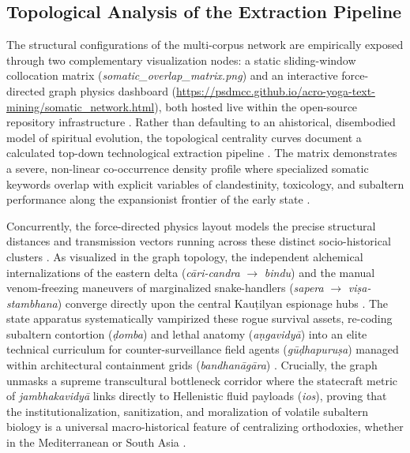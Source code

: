 \documentclass[11pt,twoside,letterpaper]{article}
\begin{document}
\subsection{Topological Analysis of the Extraction Pipeline}
The structural configurations of the multi-corpus network are empirically exposed through two complementary visualization nodes: a static sliding-window collocation matrix (\textit{somatic\_overlap\_matrix.png}) and an interactive force-directed graph physics dashboard (\href{https://github.io}{https://psdmcc.github.io/acro-yoga-text-mining/somatic\_network.html}), both hosted live within the open-source repository infrastructure \citet{mccartney2021}. Rather than defaulting to an ahistorical, disembodied model of spiritual evolution, the topological centrality curves document a calculated top-down technological extraction pipeline \citep{Mallinson2017}. The matrix demonstrates a severe, non-linear co-occurrence density profile where specialized somatic keywords overlap with explicit variables of clandestinity, toxicology, and subaltern performance along the expansionist frontier of the early state \citep{Mallinson2017, mccartney2021}.

Concurrently, the force-directed physics layout models the precise structural distances and transmission vectors running across these distinct socio-historical clusters \citep{Lorenzen2011}. As visualized in the graph topology, the independent alchemical internalizations of the eastern delta (\textit{cāri-candra} $\rightarrow$ \textit{bindu}) and the manual venom-freezing maneuvers of marginalized snake-handlers (\textit{sapera} $\rightarrow$ \textit{viṣa-stambhana}) converge directly upon the central Kauṭilyan espionage hubs \citep{Lorenzen2011, Mallinson2017}. The state apparatus systematically vampirized these rogue survival assets, re-coding subaltern contortion (\textit{ḍomba}) and lethal anatomy (\textit{aṇgavidyā}) into an elite technical curriculum for counter-surveillance field agents (\textit{gūḍhapuruṣa}) managed within architectural containment grids (\textit{bandhanāgāra}) \citep{mccartney2026}. Crucially, the graph unmasks a supreme transcultural bottleneck corridor where the statecraft metric of \textit{jambhakavidyā} links directly to Hellenistic fluid payloads (\textit{ios}), proving that the institutionalization, sanitization, and moralization of volatile subaltern biology is a universal macro-historical feature of centralizing orthodoxies, whether in the Mediterranean or South Asia \citep{Debnath2024, Lorenzen2011, mccartney2021}.
\end{document}
